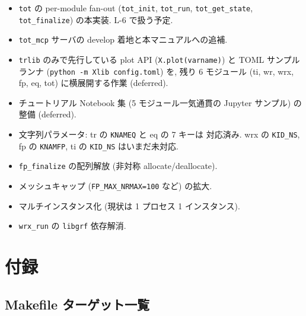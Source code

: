 \documentclass[11pt,a4paper]{report}
\begin{document}
\begin{itemize}[leftmargin=1.5em]
  \item \texttt{tot} の per-module fan-out (\texttt{tot\_init},
        \texttt{tot\_run}, \texttt{tot\_get\_state},
        \texttt{tot\_finalize}) の本実装. L-6 で扱う予定.
  \item \texttt{tot\_mcp} サーバの develop 着地と本マニュアルへの追補.
  \item \texttt{trlib} のみで先行している plot API
        (\texttt{X.plot(varname)}) と TOML サンプルランナ
        (\texttt{python -m Xlib config.toml}) を, 残り 6 モジュール
        (ti, wr, wrx, fp, eq, tot) に横展開する作業 (deferred).
  \item チュートリアル Notebook 集 (5 モジュール一気通貫の
        Jupyter サンプル) の整備 (deferred).
  \item 文字列パラメータ: tr の \texttt{KNAMEQ} と eq の 7 キーは
        対応済み. wrx の \texttt{KID\_NS}, fp の \texttt{KNAMFP},
        ti の \texttt{KID\_NS} はいまだ未対応.
  \item \texttt{fp\_finalize} の配列解放 (非対称 allocate/deallocate).
  \item メッシュキャップ (\texttt{FP\_MAX\_NRMAX=100} など) の拡大.
  \item マルチインスタンス化 (現状は 1 プロセス 1 インスタンス).
  \item \texttt{wrx\_run} の \texttt{libgrf} 依存解消.
\end{itemize}

\clearpage
\chapter{付録}
\label{ch:appendix}

\section{Makefile ターゲット一覧}
\end{document}
